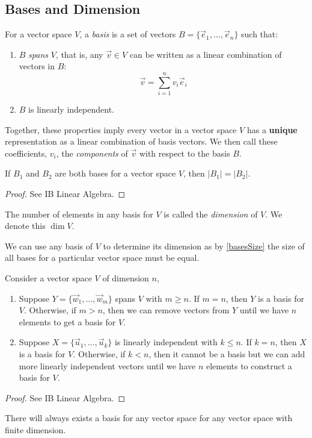 \documentclass[../main.tex]{subfiles}
\begin{document}
\subsection{Bases and Dimension}
\label{basesAndDimension}
\begin{definition}[Basis]
  For a vector space $V$, a \textit{basis} is a set of vectors $B = \{\vec{e}_1, \ldots, \vec{e}_n\}$ such that:
  \begin{enumerate}
    \item $B$ \textit{spans} $V$, that is, any $\vec{v} \in V$ can be written as a linear combination of vectors in $B$:
      \[
        \vec{v} = \sum_{i=1}^{n} v_i \vec{e}_i
      \]
    \item $B$ is linearly independent.
  \end{enumerate}
\end{definition}
Together, these properties imply every vector in a vector space $V$ has a \textbf{unique} representation as a linear combination of basis vectors.
We then call these coefficients, $v_i$, the \textit{components} of $\vec{v}$ with respect to the basis $B$.
\begin{theorem}
  If $B_1$ and $B_2$ are both bases for a vector space $V$, then $|B_1| = |B_2|$.
  \label{basesSize}
\end{theorem}
\begin{proof}
  See IB Linear Algebra.
\end{proof}
\begin{definition}[Dimension]
  The number of elements in any basis for $V$ is called the \textit{dimension} of $V$.
  We denote this $\dim V$.
\end{definition}
\begin{remark}[Note]
  We can use any basis of $V$ to determine its dimension as by \cref{basesSize} the size of all bases for a particular vector space must be equal.
\end{remark}
\begin{proposition}
  Consider a vector space $V$ of dimension $n$, \label{addBasis}
  \begin{enumerate}
    \item Suppose $Y = \{\vec{w}_1, \ldots, \vec{w}_m\}$ spans $V$ with $m \geq n$.
      If $m = n$, then $Y$ is a basis for $V$.
      Otherwise, if $m > n$, then we can remove vectors from $Y$ until we have $n$ elements to get a basis for $V$.
    \item Suppose $X = \{\vec{u}_1, \ldots, \vec{u}_k\}$ is linearly independent with $k \leq n$.
      If $k = n$, then $X$ is a basis for $V$.
      Otherwise, if $k < n$, then it cannot be a basis but we can add more linearly independent vectors until we have $n$ elements to construct a basis for $V$.
  \end{enumerate}
\end{proposition}
\begin{proof}
  See IB Linear Algebra.
\end{proof}
\begin{remark}
  There will always exists a basis for any vector space for any vector space with finite dimension.
\end{remark}
\end{document}
